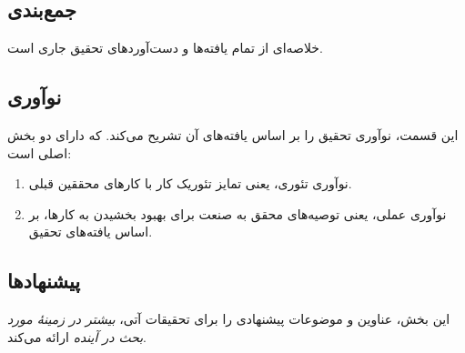 \subsection{جمع‌بندی}
خلاصه‌ای از تمام یافته‌ها و دست‌آوردهای تحقیق جاری است.

\subsection{نوآوری}
این قسمت، نوآوری تحقیق را بر اساس یافته‌های آن تشریح می‌کند. که دارای دو بخش اصلی است:
\begin{enumerate}
	\item
	نوآوری تئوری، یعنی تمایز تئوریک کار با کارهای محققین قبلی.
	\item
	نوآوری عملی، یعنی توصیه‌های محقق به صنعت برای بهبود بخشیدن به کارها، بر اساس یافته‌های تحقیق.
\end{enumerate}

\subsection{پیشنهادها}
این بخش، عناوین و موضوعات پیشنهادی را برای تحقیقات آتی،
\emph{بیشتر در زمینهٔ مورد بحث در آینده}
ارائه می‌کند.
